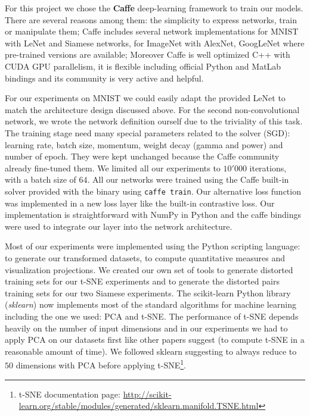 \documentclass[a4paper,12pt]{report}
\begin{document}
For this project we chose the {\bf Caffe} deep-learning framework to train our models.
There are several reasons among them: the simplicity to express networks, train or manipulate them; Caffe includes several network implementations for MNIST with LeNet and Siamese networks, for ImageNet with AlexNet, GoogLeNet where pre-trained versions are available; Moreover Caffe is well optimized C++ with CUDA GPU parallelism, it is flexible including official Python and MatLab bindings and its community is very active and helpful.

For our experiments on MNIST we could easily adapt the provided LeNet to match the architecture design discussed above.
For the second non-convolutional network, we wrote the network definition ourself due to the triviality of this task.
The training stage need many special parameters related to the solver (SGD): learning rate, batch size, momentum, weight decay (gamma and power) and number of epoch.
They were kept unchanged because the Caffe community already fine-tuned them.
We limited all our experiments to $10'000$ iterations, with a batch size of $64$.
All our networks were trained using the Caffe built-in solver provided with the binary using {\tt caffe train}.
Our alternative loss function was implemented in a new loss layer like the built-in contrastive loss.
Our implementation is straightforward with NumPy in Python and the caffe bindings were used to integrate our layer into the network architecture.


Most of our experiments were implemented using the Python scripting language: to generate our transformed datasets, to compute quantitative measures and visualization projections.
We created our own set of tools to generate distorted training sets for our t-SNE experiments and to generate the distorted pairs training sets for our two Siamese experiments.
The scikit-learn Python library ({\em sklearn}) now implements most of the standard algorithms for machine learning including the one we used: PCA and t-SNE\cite{pedregosa2011scikit}.
The performance of t-SNE depends heavily on the number of input dimensions and in our experiments we had to apply PCA on our datasets first like other papers suggest\cite{t-SNE} (to compute t-SNE in a reasonable amount of time).
We followed sklearn suggesting to always reduce to $50$ dimensions with PCA before applying t-SNE\footnote{t-SNE documentation page: \url{http://scikit-learn.org/stable/modules/generated/sklearn.manifold.TSNE.html}}.
\end{document}
